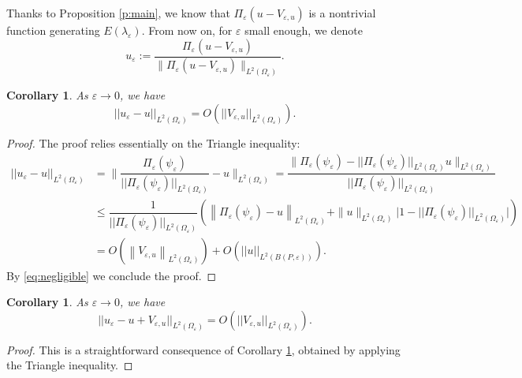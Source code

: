 \documentclass[11pt,reqno]{article}
\newtheorem{cor}[teo]{Corollary}
\numberwithin{equation}{section}
\newcommand\e\varepsilon
\renewcommand\O\Omega
\begin{document}
Thanks to Proposition \ref{p:main}, we know that $\Pi_\e(u-V_{\e,u})$ is a nontrivial function generating $E(\lambda_\e)$. From now on, for $\e$ small enough, we denote
\begin{equation}\label{eq1405-1}
    u_\e := \dfrac{\Pi_\e (u-V_{\e,u})}{\|\Pi_\e (u-V_{\e,u})\|_{L^2(\Omega_\e)}}.
\end{equation}



\begin{cor}\label{l:s2}
As $\e\to0$, we have
\begin{equation}\label{s2}
			||u_\e-u||_{L^2(\Omega_\e)}=O(||V_{\e,u}||_{L^2(\Omega_\e)}).
\end{equation}
\end{cor}
\begin{proof}
		The proof relies essentially on the Triangle inequality:
		\begin{align*}
			||u_\e-u||_{L^2(\Omega_\e)}
			&= \Big\|\dfrac{\Pi_\e(\psi_\e)}{||\Pi_\e(\psi_\e)||_{L^2(\Omega_\e)}}-u\Big\|_{L^2(\Omega_\e)} 
			= \dfrac{\Big\|\Pi_\e(\psi_\e)- ||\Pi_\e(\psi_\e)||_{L^2(\Omega_\e)} u\Big\|_{L^2(\Omega_\e)}}{||\Pi_\e(\psi_\e)||_{L^2(\Omega_\e)}}\\
			&\leq \dfrac{1}{||\Pi_\e(\psi_\e)||_{L^2(\Omega_\e)}} \left(\left\|\Pi_\e(\psi_\e)- u \right\|_{L^2(\Omega_\e)} + \|u\|_{L^2(\Omega_\e)} \big|1- ||\Pi_\e(\psi_\e)||_{L^2(\Omega_\e)}\big|\right)\\
			&= O(\left\| V_{\e,u} \right\|_{L^2(\Omega_\e)})+O(||u||_{L^2( B(P,\e))}).
		\end{align*}
By \eqref{eq:negligible} we conclude the proof.
\end{proof}

\begin{cor}\label{c:1}
    As $\e\to0$, we have 
    \begin{equation}\label{s1}
			||u_\e-u+V_{\e,u}||_{L^2(\O_\e)}=O(||V_{\e,u}||_{L^2(\Omega_\e)}).
    \end{equation}
\end{cor}
\begin{proof}
    This is a straightforward consequence of Corollary \ref{l:s2}, obtained by  applying the Triangle inequality.
\end{proof}
\end{document}
